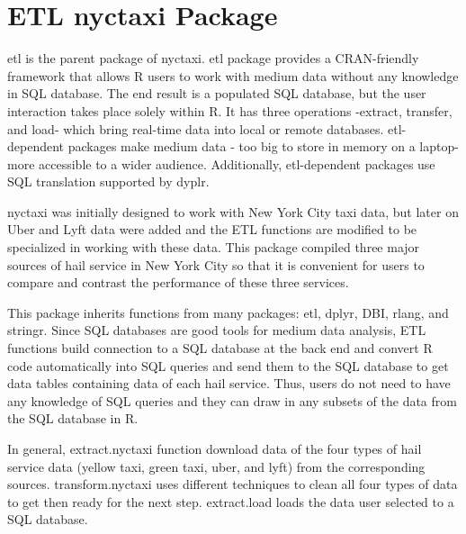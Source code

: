 \documentclass[12pt,twoside]{reedthesis}
\theoremstyle{definition}
\theoremstyle{definition}
\theoremstyle{definition}
\theoremstyle{remark}
\begin{document}
\section{ETL nyctaxi Package}\label{etl-nyctaxi-package}

etl is the parent package of nyctaxi. etl package provides a
CRAN-friendly framework that allows R users to work with medium data
without any knowledge in SQL database. The end result is a populated SQL
database, but the user interaction takes place solely within R. It has
three operations -extract, transfer, and load- which bring real-time
data into local or remote databases. etl-dependent packages make medium
data - too big to store in memory on a laptop- more accessible to a
wider audience. Additionally, etl-dependent packages use SQL translation
supported by dyplr.

nyctaxi was initially designed to work with New York City taxi data, but
later on Uber and Lyft data were added and the ETL functions are
modified to be specialized in working with these data. This package
compiled three major sources of hail service in New York City so that it
is convenient for users to compare and contrast the performance of these
three services.

This package inherits functions from many packages: etl, dplyr, DBI,
rlang, and stringr. Since SQL databases are good tools for medium data
analysis, ETL functions build connection to a SQL database at the back
end and convert R code automatically into SQL queries and send them to
the SQL database to get data tables containing data of each hail
service. Thus, users do not need to have any knowledge of SQL queries
and they can draw in any subsets of the data from the SQL database in R.

In general, extract.nyctaxi function download data of the four types of
hail service data (yellow taxi, green taxi, uber, and lyft) from the
corresponding sources. transform.nyctaxi uses different techniques to
clean all four types of data to get then ready for the next step.
extract.load loads the data user selected to a SQL database.
\end{document}

